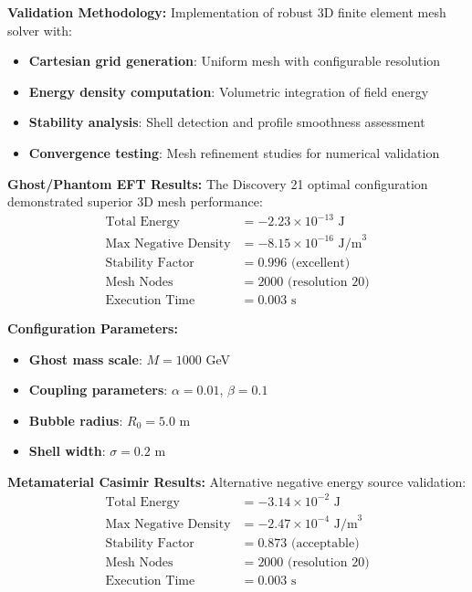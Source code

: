 \documentclass[11pt]{article}
\begin{document}
\textbf{Validation Methodology:}
Implementation of robust 3D finite element mesh solver with:
\begin{itemize}
    \item \textbf{Cartesian grid generation}: Uniform mesh with configurable resolution
    \item \textbf{Energy density computation}: Volumetric integration of field energy
    \item \textbf{Stability analysis}: Shell detection and profile smoothness assessment
    \item \textbf{Convergence testing}: Mesh refinement studies for numerical validation
\end{itemize}

\textbf{Ghost/Phantom EFT Results:}
The Discovery 21 optimal configuration demonstrated superior 3D mesh performance:
\begin{align}
\text{Total Energy} &= -2.23 \times 10^{-13} \text{ J} \\
\text{Max Negative Density} &= -8.15 \times 10^{-16} \text{ J/m}^3 \\
\text{Stability Factor} &= 0.996 \text{ (excellent)} \\
\text{Mesh Nodes} &= 2000 \text{ (resolution 20)} \\
\text{Execution Time} &= 0.003 \text{ s}
\end{align}

\textbf{Configuration Parameters:}
\begin{itemize}
    \item \textbf{Ghost mass scale}: $M = 1000$ GeV
    \item \textbf{Coupling parameters}: $\alpha = 0.01$, $\beta = 0.1$
    \item \textbf{Bubble radius}: $R_0 = 5.0$ m
    \item \textbf{Shell width}: $\sigma = 0.2$ m
\end{itemize}

\textbf{Metamaterial Casimir Results:}
Alternative negative energy source validation:
\begin{align}
\text{Total Energy} &= -3.14 \times 10^{-2} \text{ J} \\
\text{Max Negative Density} &= -2.47 \times 10^{-4} \text{ J/m}^3 \\
\text{Stability Factor} &= 0.873 \text{ (acceptable)} \\
\text{Mesh Nodes} &= 2000 \text{ (resolution 20)} \\
\text{Execution Time} &= 0.003 \text{ s}
\end{align}
\end{document}
